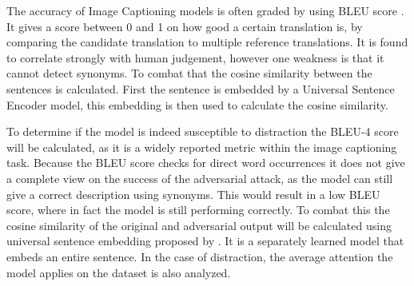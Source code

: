 The accuracy of Image Captioning models is often graded by using BLEU score \cite{papineni_roukos_ward_zhu_2001}. It gives a score between 0 and 1 on how good a certain translation is, by comparing the candidate translation to multiple reference translations. It is found to correlate strongly with human judgement, however one weakness is that it cannot detect synonyms. To combat that the cosine similarity between the sentences is calculated. First the sentence is embedded by a Universal Sentence Encoder\cite{DBLP:journals/corr/abs-1803-11175} model, this embedding is then used to calculate the cosine similarity. 

To determine if the model is indeed susceptible to distraction the BLEU-4 score \cite{papineni_roukos_ward_zhu_2001} will be calculated, as it is a widely reported metric within the image captioning task. Because the BLEU score checks for direct word occurrences it does not give a complete view on the success of the adversarial attack, as the model can still give a correct description using synonyms. This would result in a low BLEU score, where in fact the model is still performing correctly. To combat this the cosine similarity of the original and adversarial output will be calculated using universal sentence embedding proposed by \citeauthor{DBLP:journals/corr/abs-1803-11175}. It is a separately learned model that embeds an entire sentence.
In the case of distraction, the average attention the model applies on the dataset is also analyzed.
